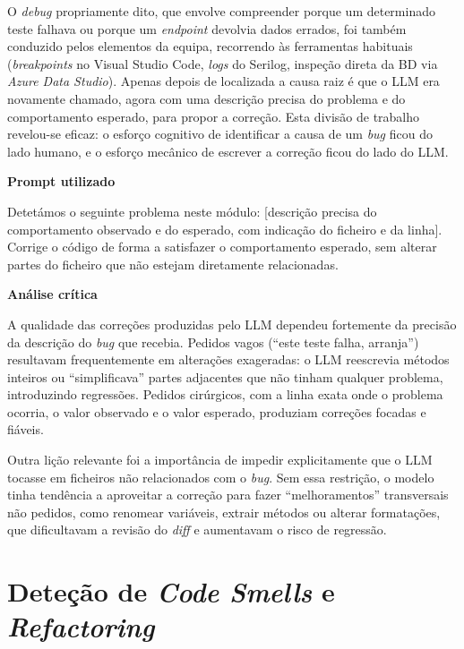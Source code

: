     O \textit{debug} propriamente dito, que envolve compreender porque um determinado teste falhava ou porque um \textit{endpoint} devolvia dados errados, foi também conduzido pelos elementos da equipa, recorrendo às ferramentas habituais (\textit{breakpoints} no Visual Studio Code, \textit{logs} do Serilog, inspeção direta da BD via \textit{Azure Data Studio}). Apenas depois de localizada a causa raiz é que o LLM era novamente chamado, agora com uma descrição precisa do problema e do comportamento esperado, para propor a correção. Esta divisão de trabalho revelou-se eficaz: o esforço cognitivo de identificar a causa de um \textit{bug} ficou do lado humano, e o esforço mecânico de escrever a correção ficou do lado do LLM.

    \begin{tcolorbox}[title=Interação com o LLM]
    \textbf{Prompt utilizado}

    Detetámos o seguinte problema neste módulo: [descrição precisa do comportamento observado e do esperado, com indicação do ficheiro e da linha]. Corrige o código de forma a satisfazer o comportamento esperado, sem alterar partes do ficheiro que não estejam diretamente relacionadas.

    \tcblower

    \textbf{Análise crítica}

    A qualidade das correções produzidas pelo LLM dependeu fortemente da precisão da descrição do \textit{bug} que recebia. Pedidos vagos (``este teste falha, arranja'') resultavam frequentemente em alterações exageradas: o LLM reescrevia métodos inteiros ou ``simplificava'' partes adjacentes que não tinham qualquer problema, introduzindo regressões. Pedidos cirúrgicos, com a linha exata onde o problema ocorria, o valor observado e o valor esperado, produziam correções focadas e fiáveis.

    Outra lição relevante foi a importância de impedir explicitamente que o LLM tocasse em ficheiros não relacionados com o \textit{bug}. Sem essa restrição, o modelo tinha tendência a aproveitar a correção para fazer ``melhoramentos'' transversais não pedidos, como renomear variáveis, extrair métodos ou alterar formatações, que dificultavam a revisão do \textit{diff} e aumentavam o risco de regressão.
    \end{tcolorbox}

\section{Deteção de \textit{Code Smells} e \textit{Refactoring}}

